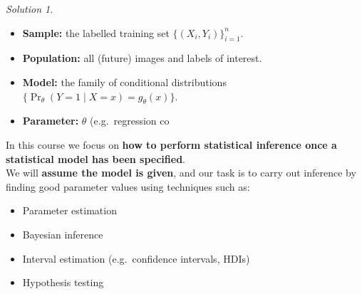 \documentclass[
  letterpaper,
  DIV=11,
  numbers=noendperiod]{scrreprt}
\providecommand{\tightlist}{%
  \setlength{\itemsep}{0pt}\setlength{\parskip}{0pt}}
\theoremstyle{definition}
\theoremstyle{plain}
\theoremstyle{definition}
\theoremstyle{remark}
\newtheorem{refsolution}{Solution}[chapter]
\begin{document}
\begin{refsolution}
\leavevmode

\begin{itemize}
\tightlist
\item
  \textbf{Sample:} the labelled training set
  \(\{(X_i,Y_i)\}_{i=1}^n\).\\
\item
  \textbf{Population:} all (future) images and labels of interest.\\
\item
  \textbf{Model:} the family of conditional distributions
  \(\{ \Pr_\theta(Y=1\mid X=x)=g_\theta(x)\}\).\\
\item
  \textbf{Parameter:} \(\theta\) (e.g.~regression co
\end{itemize}

\label{sol-ml-inference}

\end{refsolution}

\begin{tcolorbox}[enhanced jigsaw, left=2mm, toprule=.15mm, breakable, opacityback=0, titlerule=0mm, toptitle=1mm, colbacktitle=quarto-callout-warning-color!10!white, colframe=quarto-callout-warning-color-frame, coltitle=black, rightrule=.15mm, leftrule=.75mm, bottomrule=.15mm, arc=.35mm, bottomtitle=1mm, title=\textcolor{quarto-callout-warning-color}{\faExclamationTriangle}\hspace{0.5em}{Note on Statistical Models}, colback=white, opacitybacktitle=0.6]

In this course we focus on \textbf{how to perform statistical inference
once a statistical model has been specified}.\\
We will \textbf{assume the model is given}, and our task is to carry out
inference by finding good parameter values using techniques such as:

\begin{itemize}
\tightlist
\item
  Parameter estimation\\
\item
  Bayesian inference\\
\item
  Interval estimation (e.g.~confidence intervals, HDIs)\\
\item
  Hypothesis testing
\end{itemize}

\end{tcolorbox}
\end{document}
